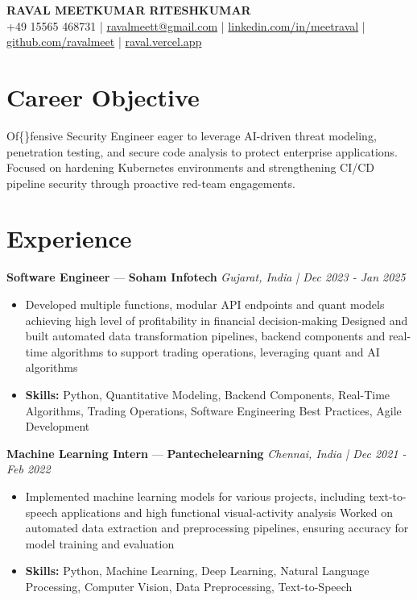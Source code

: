 \documentclass[a4paper,10pt]{article}
\begin{document}
\begin{center}
  {\Large\bfseries RAVAL MEETKUMAR RITESHKUMAR}\\[2pt]
  {\small +49 15565 468731 \;|\; \href{mailto:ravalmeett@gmail.com}{ravalmeett@gmail.com} \;|\; \href{https://www.linkedin.com/in/meetraval/}{linkedin.com/in/meetraval} \;|\; \href{https://github.com/ravalmeet}{github.com/ravalmeet} \;|\; \href{https://raval.vercel.app/}{raval.vercel.app}}
\end{center}
\vspace{-3pt}

\section*{Career Objective}
Of\{\}fensive Security Engineer eager to leverage AI-driven threat modeling, penetration testing, and secure code analysis to protect enterprise applications. Focused on hardening Kubernetes environments and strengthening CI/CD pipeline security through proactive red-team engagements.\par

\section*{Experience}
\textbf{Software Engineer} — \textbf{Soham Infotech} \hfill \textit{Gujarat, India \;|\; Dec 2023 - Jan 2025}\par
\vspace{1pt}
\begin{itemize}
  \item Developed multiple functions, modular API endpoints and quant models achieving high level of profitability in financial decision-making Designed and built automated data transformation pipelines, backend components and real-time algorithms to support trading operations, leveraging quant and AI algorithms
  \item \textbf{Skills:} Python, Quantitative Modeling, Backend Components, Real-Time Algorithms, Trading Operations, Software Engineering Best Practices, Agile Development
\end{itemize}
\vspace{3pt}
\textbf{Machine Learning Intern} — \textbf{Pantechelearning} \hfill \textit{Chennai, India \;|\; Dec 2021 - Feb 2022}\par
\vspace{1pt}
\begin{itemize}
  \item Implemented machine learning models for various projects, including text-to-speech applications and high functional visual-activity analysis Worked on automated data extraction and preprocessing pipelines, ensuring accuracy for model training and evaluation
  \item \textbf{Skills:} Python, Machine Learning, Deep Learning, Natural Language Processing, Computer Vision, Data Preprocessing, Text-to-Speech
\end{itemize}
\end{document}
